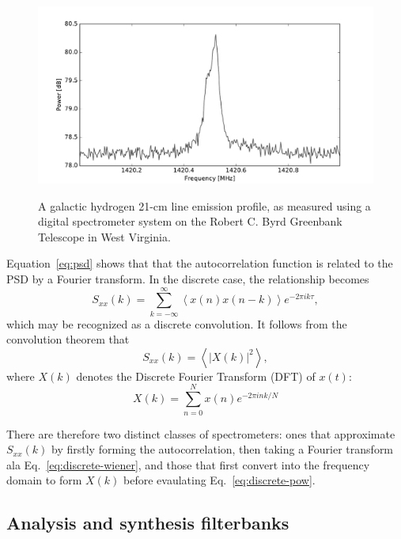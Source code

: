 \documentclass{ws-rv961x669}
\begin{document}
\begin{figure}
 \centering
 \includegraphics[width=\textwidth]{./figures/hydrogen.pdf}
 \label{fig:hydrogen}
 \caption{A galactic hydrogen 21-cm line emission profile, as measured using a digital spectrometer system on the Robert C. Byrd Greenbank Telescope in West Virginia.}
\end{figure}

Equation~\ref{eq:psd} shows that that the autocorrelation function is related to the PSD by a Fourier transform. In the discrete case, the relationship becomes
\begin{equation}
S_{xx}(k)=\sum_{k=-\infty}^{\infty}\left\langle x(n)x(n-k)\right\rangle e^{-2\pi ik\tau},\label{eq:discrete-wiener}
\end{equation}
which may be recognized as a discrete convolution. It follows from the convolution theorem that 
\begin{equation}
S_{xx}(k)=\left\langle \left|X(k)\right|^{2}\right\rangle ,\label{eq:discrete-pow}
\end{equation}
where $X(k)$ denotes the Discrete Fourier Transform (DFT) of $x(t)$:
\begin{equation}
X(k)=\sum_{n=0}^{N}x(n)e^{-2\pi ink/N}
\end{equation}

There are therefore two distinct classes of spectrometers: ones that approximate $S_{xx}(k)$ by firstly forming the autocorrelation, then taking a Fourier transform ala Eq.~\ref{eq:discrete-wiener}, and those that first convert into the frequency domain to form $X(k)$ before evaulating Eq.~\ref{eq:discrete-pow}.

\subsection{Analysis and synthesis filterbanks}
\end{document}
